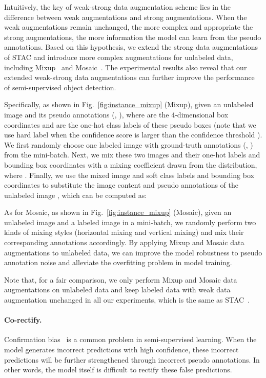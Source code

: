 \documentclass[final]{cvpr}
\begin{document}
Intuitively, the key of weak-strong data augmentation scheme lies in the difference between weak augmentations and strong augmentations. When the weak augmentations remain unchanged, the more complex and appropriate the strong augmentations, the more information the model can learn from the pseudo annotations.
Based on this hypothesis, we extend the strong data augmentations of STAC and introduce more complex augmentations for unlabeled data, including Mixup~\cite{zhang2017mixup} and Mosaic~\cite{bochkovskiy2020yolov4}. The experimental results also reveal that our extended weak-strong data augmentations can further improve the performance of semi-supervised object detection.

Specifically, as shown in Fig.~\ref{fig:instance_mixup} (Mixup), given an unlabeled image  and its pseudo annotations (, ), where  are the 4-dimensional box coordinates and  are the one-hot class labels of these pseudo boxes (note that we use hard label when the confidence score is larger than the confidence threshold ). We first randomly choose one labeled image  with ground-truth annotations (, ) from the mini-batch. Next, we mix these two images and their one-hot labels and bounding box coordinates with a mixing coefficient  drawn from the  distribution, where . Finally, we use the mixed image and soft class labels and bounding box coordinates to substitute the image content and pseudo annotations of the unlabeled image , which can be computed as:


As for Mosaic, as shown in Fig.~\ref{fig:instance_mixup} (Mosaic), given an unlabeled image  and a labeled image  in a mini-batch, we randomly perform two kinds of mixing styles (horizontal mixing and vertical mixing) and mix their corresponding annotations accordingly.
By applying Mixup and Mosaic data augmentations to unlabeled data, we can improve the model robustness to pseudo annotation noise and alleviate the overfitting problem in model training.

Note that, for a fair comparison, we only perform Mixup and Mosaic data augmentations on unlabeled data and keep labeled data with weak data augmentation unchanged in all our experiments, which is the same as STAC~\cite{sohn2020simple}. 



\paragraph{Co-rectify.} 

Confirmation bias~\cite{tarvainen2017mean} is a common problem in semi-supervised learning. When the model generates incorrect predictions with high confidence, these incorrect predictions will be further strengthened 
through incorrect pseudo annotations.
In other words, the model itself is difficult to rectify these false predictions.
\end{document}
